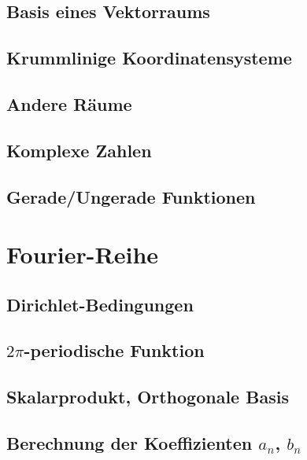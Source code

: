 \documentclass[a4paper, 11pt, accentcolor = tud3b]{tudreport}
\begin{document}
			\subsection{Basis eines Vektorraums} %

			\subsection{Krummlinige Koordinatensysteme} %

			\subsection{Andere Räume} %

			\subsection{Komplexe Zahlen} %

			\subsection{Gerade/Ungerade Funktionen} %

		\section{Fourier-Reihe} %

			\subsection{Dirichlet-Bedingungen} %

			\subsection{\(2\pi\)-periodische Funktion} %

			\subsection{Skalarprodukt, Orthogonale Basis} %

			\subsection{Berechnung der Koeffizienten \(a_n\), \(b_n\)} %
\end{document}
